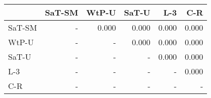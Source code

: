 \begin{tabular}{lrrrrr}
\toprule
 & SaT-SM & WtP-U & SaT-U & L-3 & C-R \\
\midrule
SaT-SM & - & 0.000 & 0.000 & 0.000 & 0.000 \\
WtP-U & - & - & 0.000 & 0.000 & 0.000 \\
SaT-U & - & - & - & 0.000 & 0.000 \\
L-3 & - & - & - & - & 0.000 \\
C-R & - & - & - & - & - \\
\bottomrule
\end{tabular}

